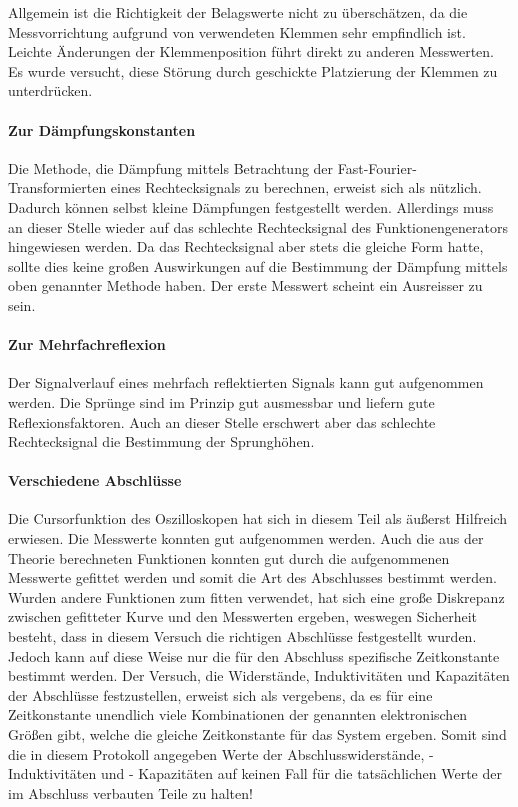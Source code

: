 Allgemein ist die Richtigkeit der Belagswerte nicht zu überschätzen, da
die Messvorrichtung aufgrund von verwendeten Klemmen sehr empfindlich
ist. Leichte Änderungen der Klemmenposition führt direkt zu anderen
Messwerten. Es wurde versucht, diese Störung durch geschickte
Platzierung der Klemmen zu unterdrücken.

\paragraph{Zur Dämpfungskonstanten}
Die Methode, die Dämpfung mittels Betrachtung der
Fast-Fourier-Transformierten eines Rechtecksignals zu berechnen, erweist
sich als nützlich. Dadurch können selbst kleine Dämpfungen festgestellt
werden.  Allerdings muss an dieser Stelle wieder auf das schlechte
Rechtecksignal des Funktionengenerators hingewiesen werden.  Da das
Rechtecksignal aber stets die gleiche Form hatte, sollte dies keine
großen Auswirkungen auf die Bestimmung der Dämpfung mittels oben
genannter Methode haben. Der erste Messwert scheint ein Ausreisser 
zu sein.

\paragraph{Zur Mehrfachreflexion}
Der Signalverlauf eines mehrfach reflektierten Signals kann gut
aufgenommen werden. Die Sprünge sind im Prinzip gut ausmessbar und
liefern gute Reflexionsfaktoren.  Auch an dieser Stelle erschwert aber
das schlechte Rechtecksignal die Bestimmung der Sprunghöhen.

\paragraph{Verschiedene Abschlüsse}
Die Cursorfunktion des Oszilloskopen hat sich in diesem Teil als äußerst
Hilfreich erwiesen. Die Messwerte konnten gut aufgenommen werden. Auch
die aus der Theorie berechneten Funktionen konnten gut durch die
aufgenommenen Messwerte gefittet werden und somit die Art des
Abschlusses bestimmt werden.  Wurden andere Funktionen zum fitten
verwendet, hat sich eine große Diskrepanz zwischen gefitteter Kurve und
den Messwerten ergeben, weswegen Sicherheit besteht, dass in diesem
Versuch die richtigen Abschlüsse festgestellt wurden.\\
Jedoch kann auf diese Weise nur die für den Abschluss spezifische 
Zeitkonstante bestimmt werden. Der Versuch, die Widerstände, 
Induktivitäten und Kapazitäten der Abschlüsse festzustellen, 
erweist sich als vergebens, da es für eine Zeitkonstante unendlich 
viele Kombinationen der genannten elektronischen Größen gibt, 
welche die gleiche Zeitkonstante für das System ergeben. Somit 
sind die in diesem Protokoll angegeben Werte der Abschlusswiderstände,
 -Induktivitäten und - Kapazitäten auf keinen Fall für die 
tatsächlichen Werte der im Abschluss verbauten Teile zu halten!
